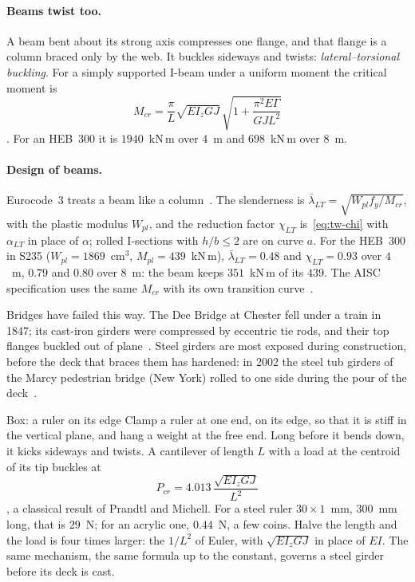 \paragraph{Beams twist too.}
%
A beam bent about its strong axis compresses one flange, and that flange is a column braced only
by the web. It buckles sideways and twists: \emph{lateral--torsional buckling}. For a simply supported
I-beam under a uniform moment the critical moment is
\begin{equation}\label{eq:tw-ltb}
  M_{cr} = \frac\pi L\sqrt{EI_zGJ}\,\sqrt{1 + \frac{\pi^2E\Gamma}{GJL^2}}
\end{equation}
\cite{tw-trahair1993,tw-ziemian2010}. For an HEB~300 it is $1940$~kN\,m over $4$~m and $698$~kN\,m over
$8$~m. \paragraph{Design of beams.}
%
Eurocode~3 treats a beam like a column~\cite[Section~6.3.2]{tw-en1993}. The slenderness is
$\bar\lambda_{LT} = \sqrt{W_{pl}f_y/M_{cr}}$, with the plastic modulus $W_{pl}$, and the reduction factor
$\chi_{LT}$ is~\eqref{eq:tw-chi} with $\alpha_{LT}$ in place of $\alpha$; rolled I-sections with $h/b \le 2$ are on curve
$a$. For the HEB~300 in S235 ($W_{pl} = 1869$~cm$^3$, $M_{pl} = 439$~kN\,m), $\bar\lambda_{LT} = 0.48$ and
$\chi_{LT} = 0.93$ over $4$~m, $0.79$ and $0.80$ over $8$~m: the beam keeps $351$~kN\,m of its $439$. The AISC
specification uses the same $M_{cr}$ with its own transition curve~\cite[Chapter~F]{tw-aisc2022}.

Bridges have failed this way. The Dee Bridge at Chester fell under a train in 1847; its cast-iron
girders were compressed by eccentric tie rods, and their top flanges buckled out of
plane~\cite{tw-petroski1994}. Steel girders are most exposed during construction, before the deck that
braces them has hardened: in 2002 the steel tub girders of the Marcy pedestrian bridge (New York) rolled to
one side during the pour of the deck~\cite{tw-enr2002}.

\begin{gbox}{Box: a ruler on its edge}\label{sec:tw-ruler}
%
Clamp a ruler at one end, on its edge, so that it is stiff in the vertical plane, and hang a weight at
the free end. Long before it bends down, it kicks sideways and twists. A cantilever of length $L$ with
a load at the centroid of its tip buckles at
\[
  P_{cr} = 4.013\,\frac{\sqrt{EI_zGJ}}{L^2}
\]
\cite{tw-trahair1993}, a classical result of Prandtl and Michell.
For a steel ruler $30\times1$~mm, $300$~mm long, that is $29$~N; for an acrylic one, $0.44$~N, a few coins.
Halve the length and the load is four times larger: the $1/L^2$ of Euler, with $\sqrt{EI_zGJ}$ in place of
$EI$. The same mechanism, the same formula up to the constant, governs a steel girder before its deck
is cast.
\end{gbox}

